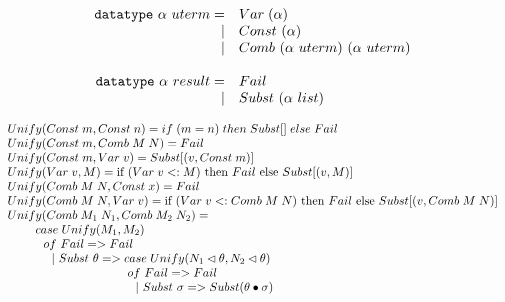  \begin{slide}
 
 \[
 \begin{array}{rl}
\mbox{\tt datatype}\ \alpha\ uterm = & Var\; (\alpha)  \\
                  | & Const\ (\alpha)    \\
                  | & Comb\ (\alpha\ uterm)\ (\alpha\ uterm) \\
 & \\
\mbox{\tt datatype}\ \alpha\ result = & Fail  \\
                  | & Subst\ (\alpha\ list)
 \end{array}
 \]
 
\[
\begin{array}{l}
Unify(Const\;m, Const\;n)  =  if\;(m = n)\;then\;Subst[]\;else\;Fail \\
Unify(Const\;m, Comb\;M\;N)  =   Fail \\
Unify(Const\;m, Var\;v)      =   Subst[(v,Const\;m)] \\
Unify(Var\;v, M)  =  \mbox{$\mbox{if}\ {(Var\;v <:M)}\ \mbox{then}\ {Fail}\ \mbox{else}\ {Subst[(v,M)]}$} \\
Unify(Comb\;M\;N, Const\;x)  =   Fail \\
Unify(Comb\;M\;N, Var\;v)  = \mbox{$\mbox{if}\ {(Var\;v <:Comb\;M\;N)}\ \mbox{then}\ {Fail}\ \mbox{else}\ {Subst[(v,Comb\;M\;N)]}$}  \\
Unify(Comb\;M_1\;N_1, Comb\;M_2\;N_2)  =   \\
{~~~~~~~} case\;Unify(M_1,M_2) \\
{~~~~~~~~~} of\ Fail => Fail  \\
{~~~~~~~~~~~} | \ Subst\ \theta  => case\;Unify(N_1 \lhd \theta, N_2 \lhd
\theta) \\ 
{~~~~~~~~~~~~~~~~~~~~~~~~~~~~~~} of\ Fail => Fail \\
{~~~~~~~~~~~~~~~~~~~~~~~~~~~~~~~~}  | \ Subst\ \sigma  => Subst(\theta \bullet \sigma)
\end{array}
\]
 
\end{slide}

